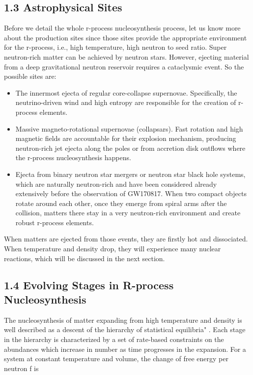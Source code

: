 \documentclass[aps,prl,preprint,groupedaddress]{revtex4}
\begin{document}
\subsection{1.3 Astrophysical Sites}\label{sec:astro}
Before we detail the whole r-process nucleosynthesis process, let us know more about the production sites since those sites provide the appropriate environment for the r-process, i.e., high temperature, high neutron to seed ratio. Super neutron-rich matter can be achieved by neutron stars. However, ejecting material from a deep gravitational neutron reservoir requires a cataclysmic event. So the possible sites are:
\begin{itemize}
\item 
The innermost ejecta of regular core-collapse supernovae. Specifically, the neutrino-driven wind and high entropy are responsible for the creation of r-process elements. 
\item Massive magneto-rotational supernovae (collapsars). Fast rotation and high magnetic fields are accountable for their explosion mechanism, producing neutron-rich jet ejecta along the poles or from accretion disk outflows where the r-process nucleosynthesis happens.   
\item Ejecta from binary neutron star mergers or neutron
star black hole systems, which are naturally neutron-rich and have been considered already extensively before the observation of GW170817. When two compact objects rotate around each other, once they emerge from spiral arms after the collision, matters there stay in a very neutron-rich environment and create robust r-process elements.
\end{itemize}
When matters are ejected from those events, they are firstly hot and dissociated. When temperature and density drop, they will experience many nuclear reactions, which will be discussed in the next section. 

\subsection{1.4 Evolving Stages in R-process Nucleosynthesis}
The nucleosynthesis of matter expanding from high temperature and density is well described as a descent of the hierarchy of statistical equilibria" \cite{1998PhRvC..58.3696M}. Each stage in the hierarchy is characterized by a set of rate-based constraints on the abundances which increase in number as time progresses in the expansion. For a system at constant temperature and volume, the change of free energy per neutron f is
\end{document}
